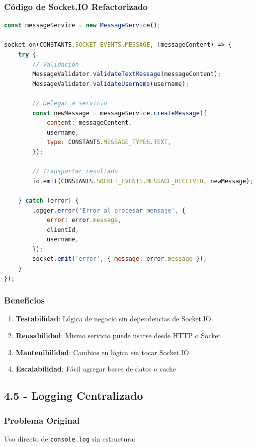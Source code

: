 \documentclass[12pt,a4paper]{article}
\begin{document}
\subsubsection{Código de Socket.IO Refactorizado}

\begin{lstlisting}[caption=Uso del Servicio en Socket.IO, language=JavaScript]
const messageService = new MessageService();

socket.on(CONSTANTS.SOCKET_EVENTS.MESSAGE, (messageContent) => {
    try {
        // Validación
        MessageValidator.validateTextMessage(messageContent);
        MessageValidator.validateUsername(username);

        // Delegar a servicio
        const newMessage = messageService.createMessage({
            content: messageContent,
            username,
            type: CONSTANTS.MESSAGE_TYPES.TEXT,
        });

        // Transportar resultado
        io.emit(CONSTANTS.SOCKET_EVENTS.MESSAGE_RECEIVED, newMessage);

    } catch (error) {
        logger.error('Error al procesar mensaje', {
            error: error.message,
            clientId,
            username,
        });
        socket.emit('error', { message: error.message });
    }
});
\end{lstlisting}

\subsubsection{Beneficios}
\begin{enumerate}
    \item \textbf{Testabilidad}: Lógica de negocio sin dependencias de Socket.IO
    \item \textbf{Reusabilidad}: Mismo servicio puede usarse desde HTTP o Socket
    \item \textbf{Mantenibilidad}: Cambios en lógica sin tocar Socket.IO
    \item \textbf{Escalabilidad}: Fácil agregar bases de datos o cache
\end{enumerate}

\subsection{4.5 - Logging Centralizado}

\subsubsection{Problema Original}
Uso directo de \texttt{console.log} sin estructura:
\end{document}
